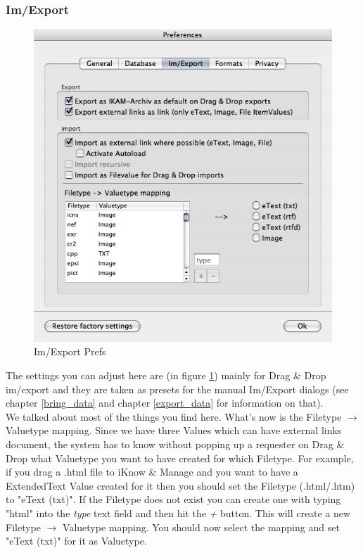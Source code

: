 \documentclass[12pt,a4]{article}
\begin{document}
\subsubsection{Im/Export}
\label{prefs_imexport}
\medskip
% 
\begin{figure}[ht]
\begin{center}
\includegraphics[width=13.5cm]{images/Prefs_ImExport.png}
\end{center}
\caption{Im/Export Prefs}
\label{image:imexportprefs}
\end{figure}
\noindent
%
The settings you can adjust here are (in figure \ref{image:imexportprefs}) mainly for Drag \& Drop im/export and they are taken as presets for the manual Im/Export dialogs (see chapter \ref{bring_data} and chapter \ref{export_data} for information on that). \\
We talked about most of the things you find here. What's now is the Filetype $\rightarrow$ Valuetype mapping. Since we have three Values which can have external links document, the system has to know without popping up a requester on Drag \& Drop what Valuetype you want to have created for which Filetype. For example, if you drag a .html file to iKnow \& Manage and you want to have a ExtendedText Value created for it then you should set the Filetype (.html/.htm) to "eText (txt)". If the Filetype does not exist you can create one with typing "html" into the \textit{type} text field and then hit the \textit{+} button. This will create a new Filetype $\rightarrow$ Valuetype mapping. You should now select the mapping and set "eText (txt)" for it as Valuetype.
\end{document}
